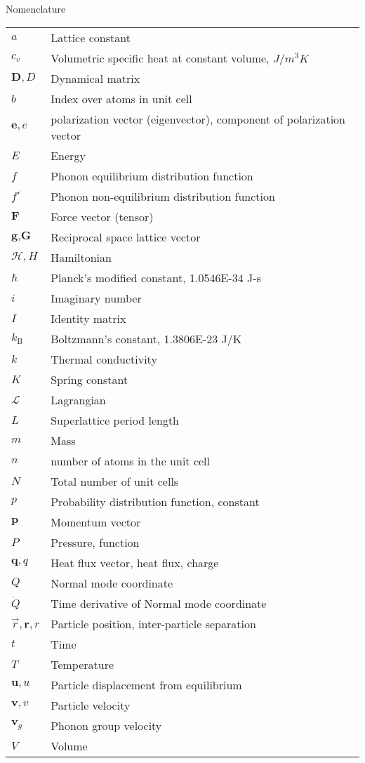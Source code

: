 \setlength{\LTleft}{0pt}
Nomenclature\\
\begin{longtable}{ l l }
$a$ & Lattice constant \\
$c_v$ & Volumetric specific heat at constant volume, $J/m^3K$\\
$\pmb{D},D$ & Dynamical matrix\\
$b$ & Index over atoms in unit cell \\
$\textbf{e},e$ & polarization vector (eigenvector), component of polarization vector\\
$E$ & Energy\\
$f$ & Phonon equilibrium distribution function\\
$f'$ & Phonon non-equilibrium distribution function\\
$\textbf{F}$ & Force vector (tensor)\\
$\textbf{g},\textbf{G}$ & Reciprocal space lattice vector\\
$\mathscr{H}, H$ & Hamiltonian \\
$\hbar$ & Planck's modified constant, 1.0546E-34 J-s\\
$i$ & Imaginary number\\
$I$ & Identity matrix\\
$k_\mathrm{B}$ & Boltzmann's constant, 1.3806E-23 J/K\\
$k$ & Thermal conductivity\\
$K$ & Spring constant\\
$\mathscr{L}$ & Lagrangian \\
$L$ & Superlattice period length\\
$m$ & Mass\\
$n$ & number of atoms in the unit cell\\
$N$ & Total number of unit cells\\
$p$ & Probability distribution function, constant\\
$\textbf{p}$ & Momentum vector\\
$P$ & Pressure, function\\
$\textbf{q},q$ & Heat flux vector, heat flux, charge\\
$Q$ & Normal mode coordinate\\
$\dot{Q}$ & Time derivative of Normal mode coordinate\\
$\vec{r},\textbf{r},r$ & Particle position, inter-particle separation\\
$t$ & Time\\
$T$ & Temperature\\
$\textbf{u},u$ & Particle displacement from equilibrium\\
$\textbf{v},v$ & Particle velocity\\
$\textbf{v}_g$ & Phonon group velocity\\
$V$ & Volume\\
\end{longtable}

